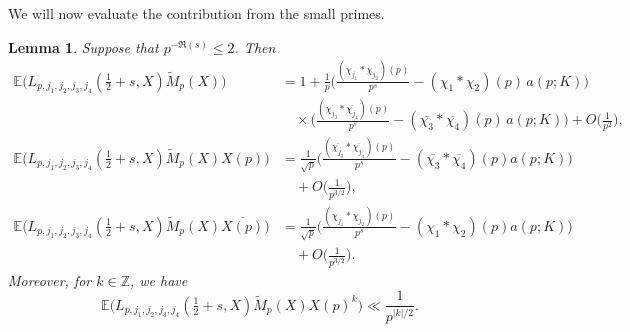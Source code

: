 \documentclass[12pt, reqno]{amsart}
\newcommand{\E}{\mathbb{E}}
\newtheorem{lemma}[theorem]{Lemma}
\numberwithin{equation}{section}
\numberwithin{theorem}{section}
\numberwithin{equation}{section}
\begin{document}
We will now evaluate the contribution from the small primes. 
\begin{lemma}
\label{primebyprime}
Suppose that $p^{-\Re(s)} \leq 2$. Then 
\begin{align*}  \E  \Big(  L_{p,j_1,j_2,j_3,j_4} ( \tfrac{1}{2}+s,X ) \widetilde{M}_p(X) \Big) &= 1+  \frac{1}{p}\Big(\frac{(\chi_{j_1}*\chi_{j_2})(p)}{p^{s}}-(\chi_1*\chi_2)(p)\,a(p;K)\Big) \\
&\quad \times \Big(\frac{(\overline{\chi_{j_3}}*\overline{\chi_{j_4}})(p)}{p^{s}}  -(\overline{\chi_3}*\overline{\chi_4})(p)\,a(p;K)\Big) + O \Big(  \frac{1}{p^2} \Big),\\
 \E \Big(  L_{p,j_1,j_2,j_3,j_4} ( \tfrac{1}{2}+s,X ) \widetilde{M}_p(X) X(p) \Big) &= \frac{1}{\sqrt{p}} \Big(\frac{(\overline{\chi_{j_3}}*\overline{\chi_{j_4}})(p)}{ p^{s}} - (\overline{\chi_3}*\overline{\chi_4})(p) a(p;K) \Big)\\
 &\quad+ O \Big(  \frac{1}{p^{3/2}}\Big),\\
 \E \Big(  L_{p,j_1,j_2,j_3,j_4} ( \tfrac{1}{2}+s,X) \widetilde{M}_p(X) \overline{X(p)} \Big) &=\frac{1}{\sqrt{p}} \Big(\frac{(\chi_{j_1}*\chi_{j_2})(p) }{p^{s}} - (\chi_1*\chi_2)(p) a(p;K)\Big)\\
 &\quad+ O \Big(  \frac{1}{p^{3/2}}\Big).
\end{align*}
Moreover, for $k \in \mathbb{Z}$, we have
$$ \E \Big( L_{p,j_1,j_2,j_3,j_4} ( \tfrac{1}{2}+s,X ) \widetilde{M}_p(X) X(p)^k \Big) \ll \frac{1}{p^{|k|/2}}.  $$
\end{lemma}
\end{document}
